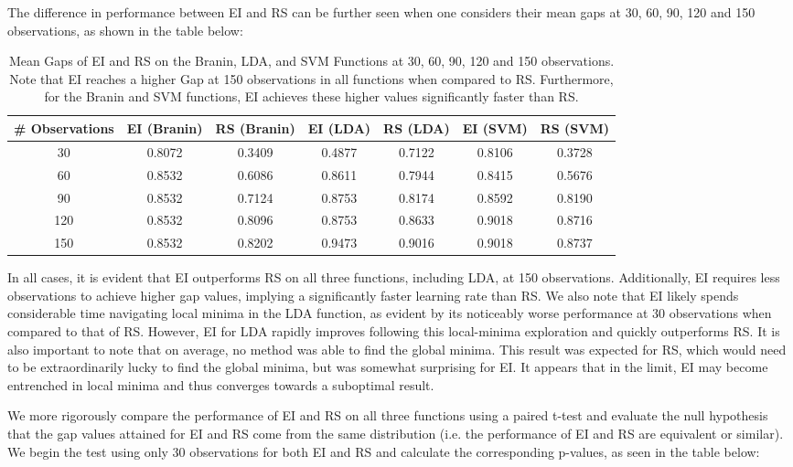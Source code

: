 \documentclass[11pt]{article}
\numberwithin{equation}{section}
\begin{document}
The difference in performance between EI and RS can be further seen when one considers their mean gaps at 30, 60, 90, 120 and 150 observations, 
as shown in the table below:
\begin{table}[H]
  \centering
  \begin{tabular}{| c | c | c | c | c | c | c |}
    \hline
    \# Observations & EI (Branin) & RS (Branin) & EI (LDA)& RS (LDA) & EI (SVM)& RS (SVM)\\ 
    \hline
    30 & 0.8072 & 0.3409 & 0.4877 & 0.7122 & 0.8106 & 0.3728 \\ 
    \hline
    60 & 0.8532 & 0.6086 & 0.8611 & 0.7944 & 0.8415 & 0.5676 \\ 
    \hline
    90 & 0.8532 & 0.7124 & 0.8753 & 0.8174 & 0.8592 & 0.8190 \\ 
    \hline
    120 & 0.8532 & 0.8096 & 0.8753 & 0.8633 & 0.9018 & 0.8716 \\ 
    \hline
    150 & 0.8532 & 0.8202 & 0.9473 & 0.9016 & 0.9018 & 0.8737 \\ 
    \hline
   \end{tabular}
   \caption{Mean Gaps of EI and RS on the Branin, LDA, and SVM Functions at 30, 60, 90, 120 and 150 observations. 
   Note that EI reaches a higher Gap at 150 observations in all functions when compared to RS. Furthermore, for the Branin and SVM functions, 
   EI achieves these higher values significantly faster than RS.}
   \label{tab:ei-rs-datasets}
\end{table}

In all cases, it is evident that EI outperforms RS on all three functions, including LDA, at 150 observations. 
Additionally, EI requires less observations to achieve higher gap values, implying a significantly faster learning rate than RS.
We also note that EI likely spends considerable time navigating local minima in the LDA function, 
as evident by its noticeably worse performance at 30 observations when compared to that of RS. 
However, EI for LDA rapidly improves following this local-minima exploration and quickly outperforms RS. 
It is also important to note that on average, no method was able to find the global minima. 
This result was expected for RS, which would need to be extraordinarily lucky to find the global minima, but was somewhat surprising for EI.
It appears that in the limit, EI may become entrenched in local minima and thus converges towards a suboptimal result. 

We more rigorously compare the performance of EI and RS on all three functions using a paired t-test and evaluate the null hypothesis that the gap values attained for EI and RS come from the same distribution (i.e. the performance of EI and RS are equivalent or similar).
We begin the test using only 30 observations for both EI and RS and calculate the corresponding p-values, as seen in the table below:
\end{document}
